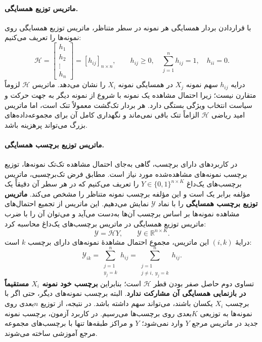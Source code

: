 \paragraph{ماتریس توزیع همسایگی.}
با قراردادن بردار همسایگی هر نمونه در سطر متناظر، ماتریس توزیع همسایگی روی نمونه‌ها را تعریف می‌کنیم:
\begin{equation}\label{cmp:eq:ch3-H}
\mathscr H=
\begin{bmatrix}h_1\\h_2\\\vdots\\h_n\end{bmatrix}
=[h_{ij}]_{n\times n},
\qquad h_{ij}\ge0,\quad
\sum_{j=1}^{n}h_{ij}=1,\quad h_{ii}=0.
\end{equation}
درایه $h_{ij}$ سهم نمونه $X_j$ در همسایگی نمونه $X_i$ را نشان می‌دهد. ماتریس $\mathscr H$ لزوماً متقارن نیست؛ زیرا احتمال مشاهده یک نمونه با شروع از نمونه دیگر به جهت حرکت و سیاست انتخاب ویژگی بستگی دارد. هر بردار تک‌گشت معمولاً تنک است، اما ماتریس امید ریاضی $\mathscr H$ الزاماً تنک باقی نمی‌ماند و نگهداری کامل آن برای مجموعه‌داده‌های بزرگ می‌تواند پرهزینه باشد.

\paragraph{ماتریس توزیع برچسب همسایگی.}
در کاربردهای دارای برچسب، گاهی به‌جای احتمال مشاهده تک‌تک نمونه‌ها، توزیع برچسب نمونه‌های مشاهده‌شده مورد نیاز است. مطابق فرض تک‌برچسبی، ماتریس برچسب‌های یک‌داغ $Y\in\{0,1\}^{n\times K}$ را تعریف می‌کنیم که در هر سطر آن دقیقاً یک مؤلفه برابر یک است و این مؤلفه برچسب نمونه متناظر را مشخص می‌کند. \textbf{ماتریس توزیع برچسب همسایگی} را با نماد $\mathscr Y$ نمایش می‌دهیم. این ماتریس از تجمیع احتمال‌های مشاهده نمونه‌ها بر اساس برچسب آن‌ها به‌دست می‌آید و می‌توان آن را با ضرب ماتریس توزیع همسایگی در ماتریس برچسب‌های یک‌داغ محاسبه کرد:
\begin{equation}\label{cmp:eq:ch3-Y-script}
\boxed{\mathscr Y=\mathscr H Y},
\qquad \mathscr Y\in\mathbb R^{n\times K}.
\end{equation}
درایهٔ $(i,k)$ این ماتریس، مجموع احتمال مشاهدهٔ نمونه‌های دارای برچسب $k$ است:
\begin{equation}\label{cmp:eq:ch3-Y-script-entry}
\mathscr Y_{ik}=\sum_{\substack{j=1\\ y_j=k}}^{n}h_{ij}
=\sum_{\substack{j=1\\ j\ne i,\;y_j=k}}^{n}h_{ij}.
\end{equation}
تساوی دوم حاصل صفر بودن قطر $\mathscr H$ است؛ بنابراین \textbf{برچسب خود نمونه $X_i$ مستقیماً در بازنمایی همسایگی آن مشارکت ندارد}. البته برچسب نمونه‌های دیگر، حتی اگر با برچسب $X_i$ یکسان باشند، می‌تواند سهم داشته باشد. در نتیجه، از توزیع $n$بعدی روی نمونه‌ها به توزیعی $K$بعدی روی برچسب‌ها می‌رسیم. در کاربرد آزمون، برچسب نمونه جدید در ماتریس مرجع $Y$ وارد نمی‌شود؛ $Y$ و مراکز طبقه‌ها تنها با برچسب‌های مجموعه مرجع آموزشی ساخته می‌شوند.

